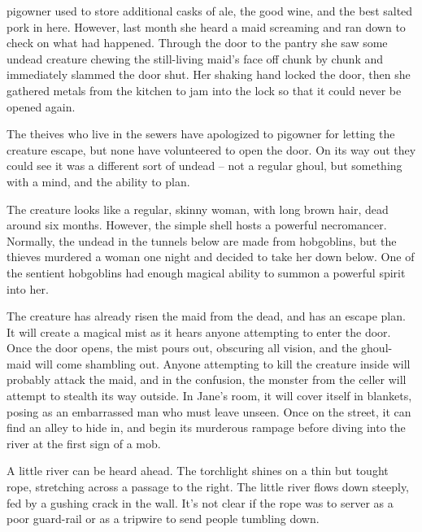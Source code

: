 \begin{multicols}{2}

\Gls{pigowner} used to store additional casks of ale, the good wine, and the best salted pork in here.  However, last month she heard a maid screaming and ran down to check on what had happened.  Through the door to the pantry she saw some undead creature chewing the still-living maid's face off chunk by chunk and immediately slammed the door shut.  Her shaking hand locked the door, then she gathered metals from the kitchen to jam into the lock so that it could never be opened again.

The theives who live in the sewers have apologized to \gls{pigowner} for letting the creature escape, but none have volunteered to open the door.  On its way out they could see it was a different sort of undead -- not a regular ghoul, but something with a mind, and the ability to plan.

The creature looks like a regular, skinny woman, with long brown hair, dead around six months.  However, the simple shell hosts a powerful necromancer.  Normally, the undead in the tunnels below are made from hobgoblins, but the thieves murdered a woman one night and decided to take her down below.  One of the sentient hobgoblins had enough magical ability to summon a powerful spirit into her.

The creature has already risen the maid from the dead, and has an escape plan.  It will create a magical mist as it hears anyone attempting to enter the door.  Once the door opens, the mist pours out, obscuring all vision, and the ghoul-maid will come shambling out.  Anyone attempting to kill the creature inside will probably attack the maid, and in the confusion, the monster from the celler will attempt to stealth its way outside.  In Jane's room, it will cover itself in blankets, posing as an embarrassed man who must leave unseen.  Once on the street, it can find an alley to hide in, and begin its murderous rampage before diving into the river at the first sign of a mob.




\ghoul


\begin{boxtext}
	A little river can be heard ahead.  The torchlight shines on a thin but tought rope, stretching across a passage to the right.  The little river flows down steeply, fed by a gushing crack in the wall.  It's not clear if the rope was to server as a poor guard-rail or as a tripwire to send people tumbling down.
\end{boxtext}


\end{multicols}

